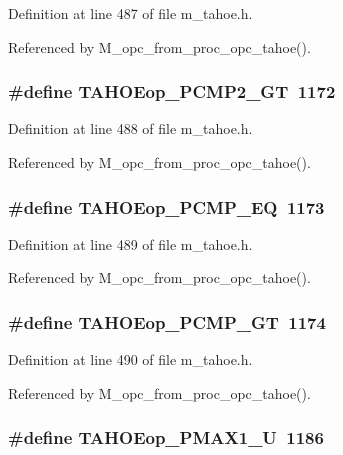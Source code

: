 Definition at line 487 of file m\_\-tahoe.h.

Referenced by M\_\-opc\_\-from\_\-proc\_\-opc\_\-tahoe().
\subsubsection{\setlength{\rightskip}{0pt plus 5cm}\#define TAHOEop\_\-PCMP2\_\-GT~1172}\label{m__tahoe_8h_f247cf401a84cbf79111f489b122198e}




Definition at line 488 of file m\_\-tahoe.h.

Referenced by M\_\-opc\_\-from\_\-proc\_\-opc\_\-tahoe().
\subsubsection{\setlength{\rightskip}{0pt plus 5cm}\#define TAHOEop\_\-PCMP\_\-EQ~1173}\label{m__tahoe_8h_f28b5e17293b477ba281ba68155f65aa}




Definition at line 489 of file m\_\-tahoe.h.

Referenced by M\_\-opc\_\-from\_\-proc\_\-opc\_\-tahoe().
\subsubsection{\setlength{\rightskip}{0pt plus 5cm}\#define TAHOEop\_\-PCMP\_\-GT~1174}\label{m__tahoe_8h_ff47334246a130d58753f18098e5cf4a}




Definition at line 490 of file m\_\-tahoe.h.

Referenced by M\_\-opc\_\-from\_\-proc\_\-opc\_\-tahoe().
\subsubsection{\setlength{\rightskip}{0pt plus 5cm}\#define TAHOEop\_\-PMAX1\_\-U~1186}\label{m__tahoe_8h_4e7beb96404770e51cabfcd61036ceca}




